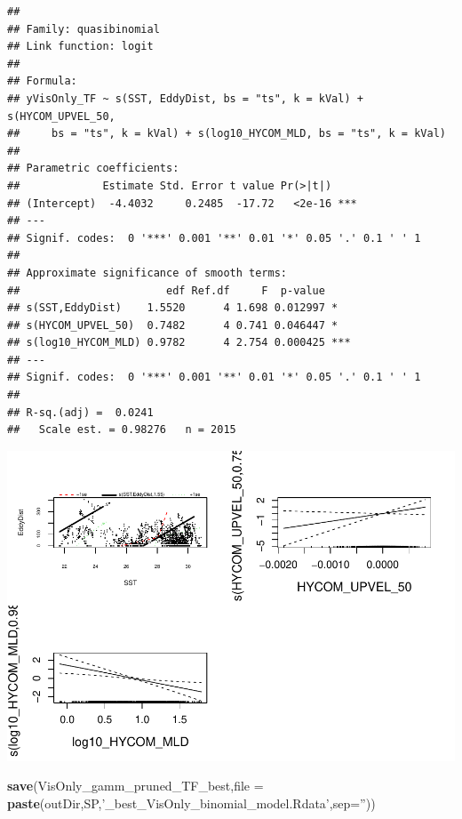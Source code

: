 \documentclass[11pt,]{article}
\makeatletter
\newenvironment{Shaded}{\begin{snugshade}}{\end{snugshade}}
\newcommand{\KeywordTok}[1]{\textcolor[rgb]{0.13,0.29,0.53}{\textbf{{#1}}}}
\newcommand{\DataTypeTok}[1]{\textcolor[rgb]{0.13,0.29,0.53}{{#1}}}
\newcommand{\DecValTok}[1]{\textcolor[rgb]{0.00,0.00,0.81}{{#1}}}
\newcommand{\FloatTok}[1]{\textcolor[rgb]{0.00,0.00,0.81}{{#1}}}
\newcommand{\StringTok}[1]{\textcolor[rgb]{0.31,0.60,0.02}{{#1}}}
\newcommand{\NormalTok}[1]{{#1}}
\def\maxwidth{\ifdim\Gin@nat@width>\linewidth\linewidth
\else\Gin@nat@width\fi}
\let\Oldincludegraphics\includegraphics
\renewcommand{\includegraphics}[1]{\Oldincludegraphics[width=\maxwidth]{#1}}
\makeatother
\begin{document}
\begin{verbatim}
## 
## Family: quasibinomial 
## Link function: logit 
## 
## Formula:
## yVisOnly_TF ~ s(SST, EddyDist, bs = "ts", k = kVal) + s(HYCOM_UPVEL_50, 
##     bs = "ts", k = kVal) + s(log10_HYCOM_MLD, bs = "ts", k = kVal)
## 
## Parametric coefficients:
##             Estimate Std. Error t value Pr(>|t|)    
## (Intercept)  -4.4032     0.2485  -17.72   <2e-16 ***
## ---
## Signif. codes:  0 '***' 0.001 '**' 0.01 '*' 0.05 '.' 0.1 ' ' 1
## 
## Approximate significance of smooth terms:
##                       edf Ref.df     F  p-value    
## s(SST,EddyDist)    1.5520      4 1.698 0.012997 *  
## s(HYCOM_UPVEL_50)  0.7482      4 0.741 0.046447 *  
## s(log10_HYCOM_MLD) 0.9782      4 2.754 0.000425 ***
## ---
## Signif. codes:  0 '***' 0.001 '**' 0.01 '*' 0.05 '.' 0.1 ' ' 1
## 
## R-sq.(adj) =  0.0241   
##   Scale est. = 0.98276   n = 2015
\end{verbatim}

\begin{Shaded}
\end{Shaded}

\includegraphics{Zc_model_runs_files/figure-latex/Vis best model summary-1.pdf}

\begin{Shaded}
\begin{Highlighting}[]
\KeywordTok{save}\NormalTok{(VisOnly_gamm_pruned_TF_best,}\DataTypeTok{file =} \KeywordTok{paste}\NormalTok{(outDir,SP,}\StringTok{'_best_VisOnly_binomial_model.Rdata'}\NormalTok{,}\DataTypeTok{sep=}\StringTok{''}\NormalTok{))}
\end{Highlighting}
\end{Shaded}
\end{document}
